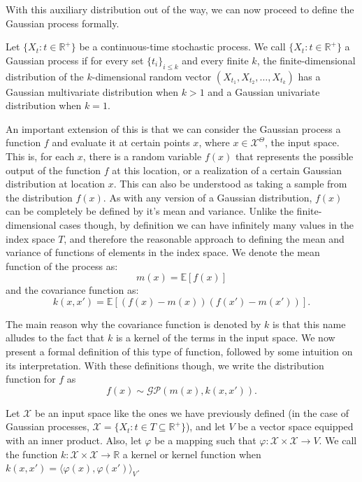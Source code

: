With this auxiliary distribution out of the way, we can now proceed to define the Gaussian process formally. 

\begin{definition}
	Let $\{ X_t: t \in \mathbb{R}^+ \}$ be a continuous-time stochastic process. We call $\{ X_t: t \in \mathbb{R}^+ \}$ a Gaussian process if for every set $\{ t_i \}_{i \leq k}$ and every finite $k$, the finite-dimensional distribution of the $k$-dimensional random vector $(X_{t_1}, X_{t_2}, \ldots, X_{t_k})$ has a Gaussian multivariate distribution when $k>1$ and a Gaussian univariate distribution when $k=1$. 
\end{definition} 

An important extension of this is that we can consider the Gaussian process a function $f$ and evaluate it at certain points $x$, where $x \in \mathcal{X}^\Theta$, the input space. This is, for each $x$, there is a random variable $f(x)$ that represents the possible output of the function $f$ at this location, or a realization of a certain Gaussian distribution at location $x$. This can also be understood as taking a sample from the distribution $f(x)$. As with any version of a Gaussian distribution, $f(x)$ can be completely be defined by it's mean and variance. Unlike the finite-dimensional cases though, by definition we can have infinitely many values in the index space $T$, and therefore the reasonable approach to defining the mean and variance of functions of elements in the index space. We denote the mean function of the process as: 
\[ m(x) = \mathbb{E}[f(x)] \]
and the covariance function as: 
\[ k(x, x') = \mathbb{E}[(f(x) - m(x))(f(x') - m(x'))]. \]

The main reason why the covariance function is denoted by $k$ is that this name alludes to the fact that $k$ is a kernel of the terms in the input space. We now present a formal definition of this type of function, followed by some intuition on its interpretation. With these definitions though, we write the distribution function for $f$ as 
\[ f(x) \sim \mathcal{GP}(m(x), k(x,x')). \]

\begin{definition}
	Let $\mathcal{X}$ be an input space like the ones we have previously defined (in the case of Gaussian processes, $\mathcal{X} = \{ X_t : t \in T \subseteq \mathbb{R}^+ \}$), and let $V$ be a vector space equipped with an inner product. Also, let $\varphi$ be a mapping such that $\varphi: \mathcal{X} \times \mathcal{X} \rightarrow V$. We call the function $k: \mathcal{X} \times \mathcal{X} \rightarrow \mathbb{R}$ a kernel or kernel function when $k(x, x') = \langle \varphi (x), \varphi (x') \rangle_V$. 
\end{definition}

